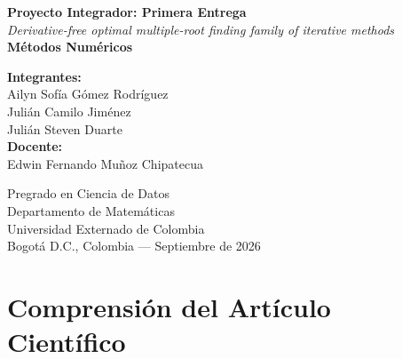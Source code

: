 \documentclass[10pt, a4paper]{article}
\begin{document}
\begin{titlepage}
    \centering
    \vspace*{2.0cm}
    
    {\LARGE\bfseries Proyecto Integrador: Primera Entrega}\\[0.5cm]
    {\large\itshape Derivative-free optimal multiple-root finding family of iterative methods}\\[0.6cm]
    {\Large\textbf{Métodos Numéricos}}\\[2.5cm]
    
    \begin{minipage}{0.85\textwidth}
        \centering
        \textbf{\large Integrantes:}\\[0.3cm]
        Ailyn Sofía Gómez Rodríguez\\[0.15cm]
        Julián Camilo Jiménez\\[0.15cm]
        Julián Steven Duarte\\[1.4cm]
        
        \textbf{\large Docente:}\\[0.3cm]
        Edwin Fernando Muñoz Chipatecua
    \end{minipage}
    
    \vfill
    
    {\normalsize Pregrado en Ciencia de Datos\\
    Departamento de Matemáticas\\
    Universidad Externado de Colombia\\
    Bogotá D.C., Colombia --- Septiembre de 2026}
    \vspace*{0.5cm}
\end{titlepage}

\newpage
{}
\setcounter{page}{2}

\section{Comprensión del Artículo Científico}
\end{document}
